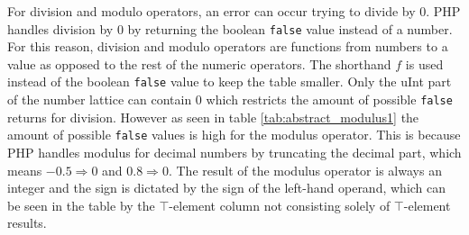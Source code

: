 \begin{table}[htbp]
\centering
{}
\caption{Abstract subtraction}
\label{tab:abstract_subtraction1}
\end{table}


For division and modulo operators, an error can occur trying to divide by 0. PHP handles division by 0 by returning the boolean \texttt{false} value instead of a number. For this reason, division and modulo operators are functions from numbers to a value as opposed to the rest of the numeric operators. The shorthand $f$ is used instead of the boolean \texttt{false} value to keep the table smaller. Only the uInt part of the number lattice can contain 0 which restricts the amount of possible \texttt{false} returns for division. However as seen in table \ref{tab:abstract_modulus1} the amount of possible \texttt{false} values is high for the modulus operator. This is because PHP handles modulus for decimal numbers by truncating the decimal part, which means $-0.5 \Rightarrow 0$ and $0.8 \Rightarrow 0$. The result of the modulus operator is always an integer and the sign is dictated by the sign of the left-hand operand, which can be seen in the table by the $\top$-element column not consisting solely of $\top$-element results.


